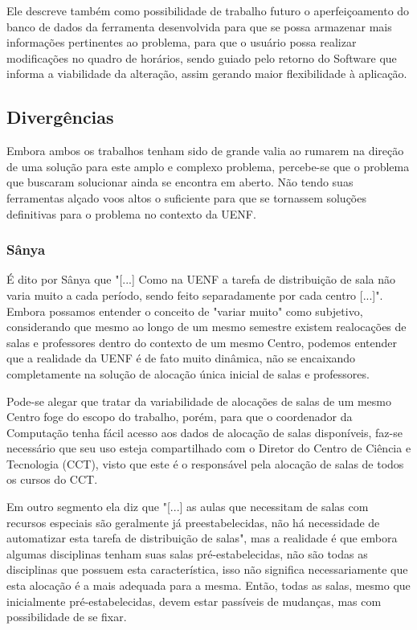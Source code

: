 Ele descreve também como possibilidade de trabalho futuro o aperfeiçoamento do banco de dados da ferramenta desenvolvida para que se possa armazenar mais informações pertinentes ao problema, para que o usuário possa realizar modificações no quadro de horários, sendo guiado pelo retorno do Software que informa a viabilidade da alteração, assim gerando maior flexibilidade à aplicação.

\subsection{Divergências} %

Embora ambos os trabalhos tenham sido de grande valia ao rumarem na direção de uma solução para este amplo e complexo problema, percebe-se que o problema que buscaram solucionar ainda se encontra em aberto. Não tendo suas ferramentas alçado voos altos o suficiente para que se tornassem soluções definitivas para o problema no contexto da UENF.

\subsubsection{Sânya} %

É dito por Sânya que "[...] Como na UENF a tarefa de distribuição de sala não varia muito a cada período, sendo feito separadamente por cada centro [...]". Embora possamos entender o conceito de "variar muito" como subjetivo, considerando que mesmo ao longo de um mesmo semestre existem realocações de salas e professores dentro do contexto de um mesmo Centro, podemos entender que a realidade da UENF é de fato muito dinâmica, não se encaixando completamente na solução de alocação única inicial de salas e professores.

Pode-se alegar que tratar da variabilidade de alocações de salas de um mesmo Centro foge do escopo do trabalho, porém, para que o coordenador da Computação tenha fácil acesso aos dados de alocação de salas disponíveis, faz-se necessário que seu uso esteja compartilhado com o Diretor do Centro de Ciência e Tecnologia (CCT), visto que este é o responsável pela alocação de salas de todos os cursos do CCT.

Em outro segmento ela diz que "[...] as aulas que necessitam de salas com recursos especiais são geralmente já preestabelecidas, não há necessidade de automatizar esta tarefa de distribuição de salas", mas a realidade é que embora algumas disciplinas tenham suas salas pré-estabelecidas, não são todas as disciplinas que possuem esta característica, isso não significa necessariamente que esta alocação é a mais adequada para a mesma. Então, todas as salas, mesmo que inicialmente pré-estabelecidas, devem estar passíveis de mudanças, mas com possibilidade de se fixar.

